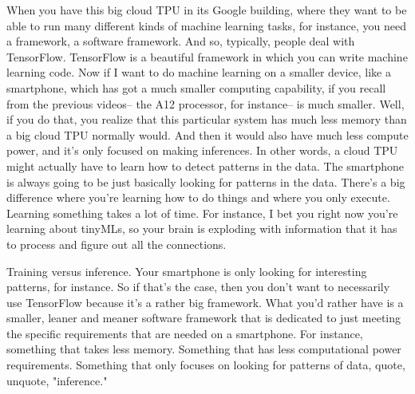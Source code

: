 When you have this big cloud TPU in its Google building,
where they want to be able to run many different kinds of machine learning
tasks, for instance, you need a framework, a software framework.
And so, typically, people deal with TensorFlow.
TensorFlow is a beautiful framework in which
you can write machine learning code.
Now if I want to do machine learning on a smaller device,
like a smartphone, which has got a much smaller computing capability, if you
recall from the previous videos--
the A12 processor, for instance-- is much smaller.
Well, if you do that, you realize that this particular system has
much less memory than a big cloud TPU normally would.
And then it would also have much less compute power,
and it's only focused on making inferences.
In other words, a cloud TPU might actually
have to learn how to detect patterns in the data.
The smartphone is always going to be just basically looking
for patterns in the data.
There's a big difference where you're learning how to do things
and where you only execute.
Learning something takes a lot of time.
For instance, I bet you right now you're learning about tinyMLs, so your brain is exploding with information that it has to process and figure out all the connections. 




Training versus inference.
Your smartphone is only looking for interesting patterns, for instance.
So if that's the case, then you don't want to necessarily use TensorFlow
because it's a rather big framework.
What you'd rather have is a smaller, leaner and meaner software framework
that is dedicated to just meeting the specific requirements that
are needed on a smartphone.
For instance, something that takes less memory.
Something that has less computational power requirements.
Something that only focuses on looking for patterns of data, quote,
unquote, "inference."



